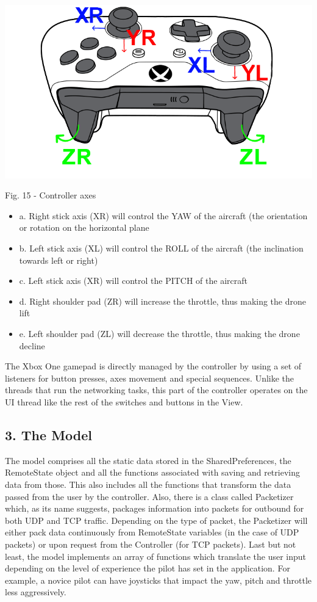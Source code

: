 \documentclass{IEEEtran}
\begin{document}
\begin{center}\includegraphics[scale=.35]{gamepad1.png}\end{center}
\begin{it}\begin{center}Fig. 15 - Controller axes \end{center}\end{it}
\begin{itemize}
    \item[] a. Right stick axis (XR) will control the YAW of the aircraft (the orientation or rotation on the horizontal plane
    \item[] b. Left stick axis (XL) will control the ROLL of the aircraft (the inclination towards left or right)
    \item[] c. Left stick axis (XR) will control the PITCH of the aircraft
    \item[] d. Right shoulder pad (ZR) will increase the throttle, thus making the drone lift
    \item[] e. Left shoulder pad (ZL) will decrease the throttle, thus making the drone decline
\end{itemize}

\noindent The Xbox One gamepad is directly managed by the controller by using a set of listeners for button presses, axes movement and special sequences. Unlike the threads that run the networking tasks, this part of the controller operates on the UI thread like the rest of the switches and buttons in the View.
\subsection*{{3. The Model}}
\noindent The model comprises all the static data stored in the SharedPreferences, the RemoteState object and all the functions associated with saving and retrieving data from those. This also includes all the functions that transform the data passed from the user by the controller. Also, there is a class called Packetizer which, as its name suggests, packages information into packets for outbound for both UDP and TCP traffic. Depending on the type of packet, the Packetizer will either pack data continuously from RemoteState variables (in the case of UDP packets) or upon request from the Controller (for TCP packets). Last but not least, the model implements an array of functions which translate the user input depending on the level of experience the pilot has set in the application. For example, a novice pilot can have joysticks that impact the yaw, pitch and throttle less aggressively. 
\end{document}
